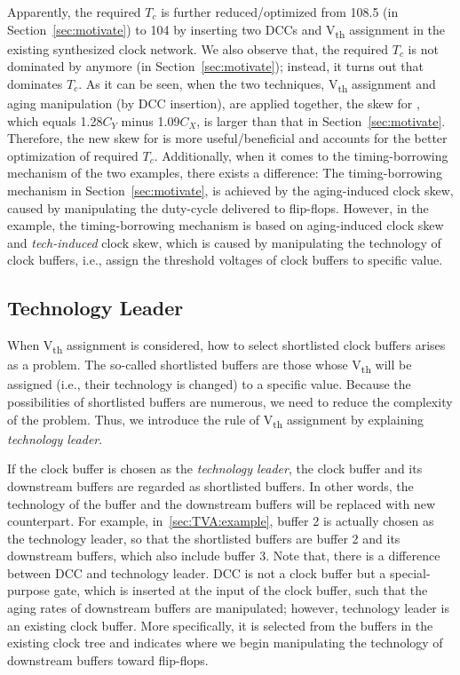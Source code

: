 Apparently, the required $T_c$ is further reduced/optimized from 108.5 (in Section~\ref{sec:motivate}) to 104 by inserting two DCCs and V\textsubscript{th} assignment in the existing synthesized clock network. We also observe that, the required $T_c$ is not dominated by  anymore (in Section~\ref{sec:motivate}); instead, it turns out that  dominates $T_c$. As it can be seen, when the two techniques, V\textsubscript{th} assignment and aging manipulation  (by DCC insertion), are applied together, the skew for , which equals 1.28$C_Y$ minus 1.09$C_X$, is larger than that in Section~\ref{sec:motivate}. Therefore, the new skew for  is more useful/beneficial and accounts for the better optimization of required $T_c$. 
Additionally, when it comes to the timing-borrowing mechanism of the two examples, there exists a difference: The timing-borrowing mechanism in Section~\ref{sec:motivate}, is achieved by the aging-induced clock skew, caused by manipulating the duty-cycle delivered to flip-flops. However, in the example, the timing-borrowing mechanism is based on aging-induced clock skew and \textit{tech-induced} clock skew, which is caused by manipulating the technology of clock buffers, i.e., assign the threshold voltages of clock buffers to specific value. 

\subsection{Technology Leader}
\label{sec:TVA:leader}
When V\textsubscript{th} assignment is considered, how to select shortlisted clock buffers arises as a problem. The so-called shortlisted buffers are those whose V\textsubscript{th} will be assigned (i.e., their technology is changed) to a specific value. Because the possibilities of shortlisted buffers are numerous, we need to reduce the complexity of the problem. Thus, we introduce the rule of V\textsubscript{th} assignment by explaining \textit{technology leader}. 

If the clock buffer is chosen as the \textit{technology leader}, the clock buffer and its downstream buffers are regarded as shortlisted buffers. In other words, the technology of the buffer and the downstream buffers will be replaced with new counterpart. For example, in~\ref{sec:TVA:example}, buffer 2 is actually chosen as the technology leader, so that the shortlisted buffers are buffer 2 and its downstream buffers, which also include buffer 3. Note that, there is a difference between DCC and technology leader. DCC is not a clock buffer but a special-purpose gate, which is inserted at the input of the clock buffer, such that the aging rates of downstream buffers are manipulated; however, technology leader is an existing clock buffer. More specifically, it is selected from the buffers in the existing clock tree and indicates where we begin manipulating the technology of downstream buffers toward flip-flops.

